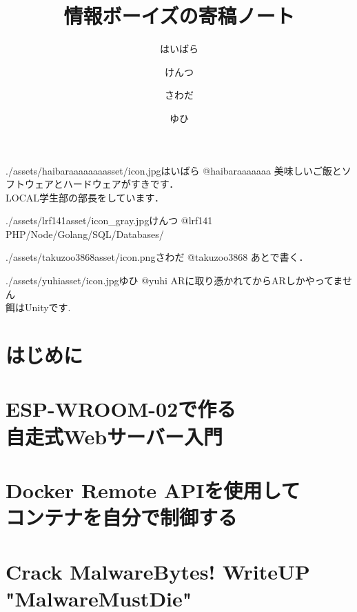 \documentclass[autodetect-engine,dvipdfmx-if-dvi,ja=standard,b5paper,10.5pt,twoside,openany,layout=v2]{bxjsbook}
\title{情報ボーイズの寄稿ノート}
\author{はいばら \and けんつ \and さわだ \and ゆひ}
\date{}
\newcommand{\articlepath}{./articles}
\newcommand{\assetspath}{./assets}
\newcommand{\lrfasset}{\assetspath/lrf141asset}
\newcommand{\haibaraaaaaaaasset}{\assetspath/haibaraaaaaaaasset}
\newcommand{\yuhiasset}{\assetspath/yuhiasset}
\newcommand{\takuzooasset}{\assetspath/takuzoo3868asset}
\begin{document}
\frontmatter
\maketitle
\begin{myintroduce}{\haibaraaaaaaaasset/icon.jpg}{はいばら @haibaraaaaaaa}
  美味しいご飯とソフトウェアとハードウェアがすきです．\\
  LOCAL学生部の部長をしています．
\end{myintroduce}
\begin{myintroduce}{\lrfasset/icon_gray.jpg}{けんつ @lrf141}
  PHP/Node/Golang/SQL/Databases/
\end{myintroduce}
\begin{myintroduce}{\takuzooasset/icon.png}{さわだ @takuzoo3868}
  あとで書く．
\end{myintroduce}
\begin{myintroduce}{\yuhiasset/icon.jpg}{ゆひ @yuhi}
ARに取り憑かれてからARしかやってません \\
餌はUnityです.
\end{myintroduce}

\chapter{はじめに}
\addtolength{\oddsidemargin}{10pt}
\addtolength{\evensidemargin}{-10pt}


\tableofcontents
\mainmatter

\chapter{ESP-WROOM-02で作る \\自走式Webサーバー入門}


\chapter{Docker Remote APIを使用して\\コンテナを自分で制御する}


\chapter{Crack MalwareBytes! WriteUP "MalwareMustDie"}

\end{document}
